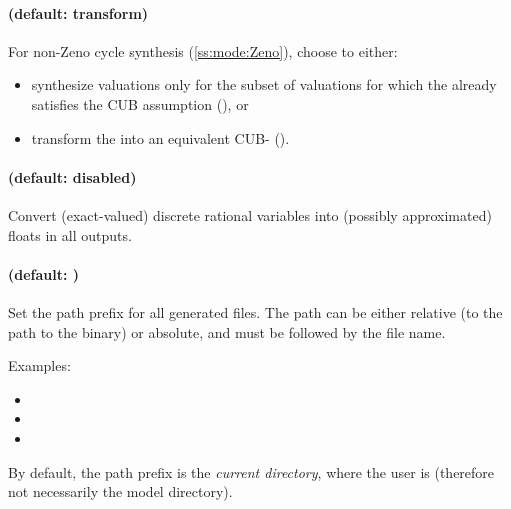 \paragraph{ (default: transform)}
For non-Zeno cycle synthesis (\cref{ss:mode:Zeno}), choose to either:
\begin{itemize}
	\item synthesize valuations only for the subset of valuations for which the \NIPTA{} already satisfies the CUB assumption (), or
	\item transform the \NIPTA{} into an equivalent CUB-\NIPTA{} ().
\end{itemize}



\paragraph{ (default: disabled)}
Convert (exact-valued) discrete rational variables into (possibly approximated) floats in all outputs.


\paragraph{ (default: )}
Set the path prefix for all generated files.
The path can be either relative (to the path to the \stylePath{\binimitator{}} binary) or absolute, and must be followed by the file name.

Examples:
\begin{itemize}
	\item {}
	\item {}
	\item {}
\end{itemize}

By default, the path prefix is the \emph{current directory}, \ie{} where the user is (therefore not necessarily the model directory).








